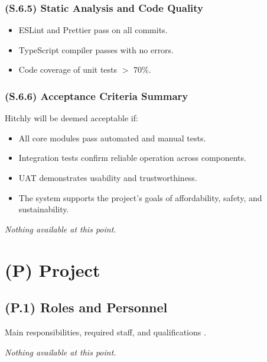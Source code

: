 \documentclass[12pt,letterpaper]{article}
\begin{document}
\subsubsection{(S.6.5) Static Analysis and Code Quality} %
\begin{itemize}
    \item ESLint and Prettier pass on all commits.
    \item TypeScript compiler passes with no errors.
    \item Code coverage of unit tests $>$ 70\%.
\end{itemize}

\subsubsection{(S.6.6) Acceptance Criteria Summary} %
Hitchly will be deemed acceptable if:

\begin{itemize}
    \item All core modules pass automated and manual tests.
    \item Integration tests confirm reliable operation across components.
    \item UAT demonstrates usability and trustworthiness.
    \item The system supports the project’s goals of affordability, safety, and sustainability.
\end{itemize}
\textit{Nothing available at this point.}

\clearpage

\section{(P) Project}

\subsection{(P.1) Roles and Personnel}
Main responsibilities, required staff, and qualifications \cite{meyer2022}.

\textit{Nothing available at this point.}
\end{document}
